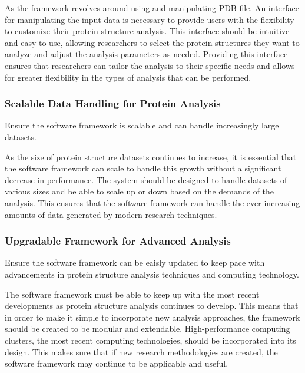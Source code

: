 \documentclass[]{final_report}
\begin{document}
As the framework revolves around using and manipulating PDB file. An interface for manipulating the input data is necessary to provide users with the flexibility to customize their protein structure analysis. This interface should be intuitive and easy to use, allowing researchers to select the protein structures they want to analyze and adjust the analysis parameters as needed. Providing this interface ensures that researchers can tailor the analysis to their specific needs and allows for greater flexibility in the types of analysis that can be performed.

\subsubsection{Scalable Data Handling for Protein Analysis}

\begin{displayquote}
    Ensure the software framework is scalable and can handle increasingly large datasets.
\end{displayquote}

As the size of protein structure datasets continues to increase, it is essential that the software framework can scale to handle this growth without a significant decrease in performance. The system should be designed to handle datasets of various sizes and be able to scale up or down based on the demands of the analysis. This ensures that the software framework can handle the ever-increasing amounts of data generated by modern research techniques.
\clearpage

\subsubsection{Upgradable Framework for Advanced Analysis}

\begin{displayquote}
    Ensure the software framework can be eaisly updated to keep pace with advancements in protein structure analysis techniques and computing technology.
\end{displayquote}

The software framework must be able to keep up with the most recent developments as protein structure analysis continues to develop. This means that in order to make it simple to incorporate new analysis approaches, the framework should be created to be modular and extendable. High-performance computing clusters, the most recent computing technologies, should be incorporated into its design. This makes sure that if new research methodologies are created, the software framework may continue to be applicable and useful.
\end{document}
